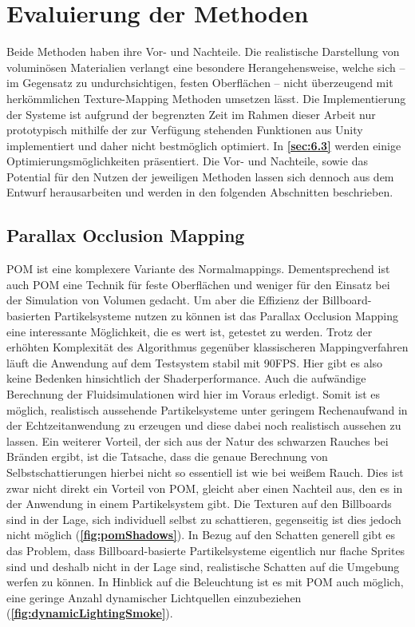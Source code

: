 \section{Evaluierung der Methoden}
\label{sec:5}

Beide Methoden haben ihre Vor- und Nachteile. Die realistische Darstellung von voluminösen Materialien verlangt
eine besondere Herangehensweise, welche sich – im Gegensatz zu undurchsichtigen, festen Oberflächen –
nicht überzeugend mit herkömmlichen Texture-Mapping Methoden umsetzen lässt.
Die Implementierung der Systeme ist aufgrund der begrenzten Zeit im Rahmen dieser Arbeit nur prototypisch mithilfe der
zur Verfügung stehenden Funktionen aus Unity implementiert und daher nicht bestmöglich optimiert.
In \textbf{\autoref{sec:6.3}} werden einige Optimierungsmöglichkeiten präsentiert.
Die Vor- und Nachteile, sowie das Potential für den Nutzen der jeweiligen Methoden lassen sich dennoch aus dem Entwurf
herausarbeiten und werden in den folgenden Abschnitten beschrieben.


\subsection{Parallax Occlusion Mapping}
\label{sec:5.1}


POM ist eine komplexere Variante des Normalmappings. Dementsprechend ist auch POM eine Technik für feste Oberflächen und weniger
für den Einsatz bei der Simulation von Volumen gedacht. Um aber die Effizienz der Billboard-basierten Partikelsysteme
nutzen zu können ist das Parallax Occlusion Mapping eine interessante Möglichkeit, die es wert ist, getestet zu werden.
Trotz der erhöhten Komplexität des Algorithmus gegenüber klassischeren Mappingverfahren läuft die Anwendung auf dem Testsystem
stabil mit 90FPS. Hier gibt es also keine Bedenken hinsichtlich der Shaderperformance. Auch die aufwändige Berechnung der
Fluidsimulationen wird hier im Voraus erledigt. Somit ist es möglich, realistisch aussehende Partikelsysteme unter geringem
Rechenaufwand in der Echtzeitanwendung zu erzeugen und diese dabei noch realistisch aussehen zu lassen.
Ein weiterer Vorteil, der sich aus der Natur des schwarzen Rauches bei Bränden ergibt, ist die Tatsache, dass die genaue Berechnung
von Selbstschattierungen hierbei nicht so essentiell ist wie bei weißem Rauch.
Dies ist zwar nicht direkt ein Vorteil von POM, gleicht aber einen Nachteil aus, den es in der Anwendung in einem Partikelsystem gibt.
Die Texturen auf den Billboards sind in der Lage, sich individuell selbst zu schattieren, gegenseitig ist dies jedoch nicht möglich (\textbf{\autoref{fig:pomShadows}}). 
In Bezug auf den Schatten generell gibt es das Problem, dass Billboard-basierte Partikelsysteme eigentlich nur flache Sprites sind und deshalb nicht in der 
Lage sind, realistische Schatten auf die Umgebung werfen zu können. In Hinblick auf die Beleuchtung ist es mit POM auch möglich, eine geringe Anzahl dynamischer 
Lichtquellen einzubeziehen (\textbf{\autoref{fig:dynamicLightingSmoke}}).


